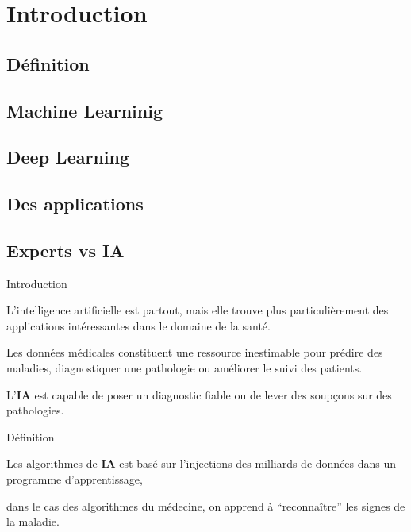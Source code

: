 \section{Introduction}
\subsection{Définition}
\subsection{Machine Learninig}
\subsection{Deep Learning}
\subsection{Des applications}
\subsection{Experts  vs IA}

\begin{frame}{Introduction}
    \begin{enumerate}[<+-|alert@+>]
        \myitem
        L'intelligence artificielle est partout, mais elle trouve plus particulièrement
        des applications intéressantes dans le domaine de la santé.

        \myitem
        Les données médicales constituent une ressource inestimable pour prédire des maladies,
        diagnostiquer une pathologie ou améliorer le suivi des patients.

        \myitem
        L'\textbf{IA} est capable de poser un diagnostic fiable ou de lever des soupçons sur des
        pathologies.\mybox
    \end{enumerate}
\end{frame}




\begin{frame}{Définition}
    \begin{itemize}[<+-|alert@+>]
        \myitem
        Les algorithmes de \textbf{IA} est basé sur  l'injections des milliards de données
        dans un programme d'apprentissage,

        \myitem
        dans le cas des algorithmes du médecine, on apprend à ``reconnaître'' les signes
        de la maladie.\mybox
    \end{itemize}

\end{frame}

